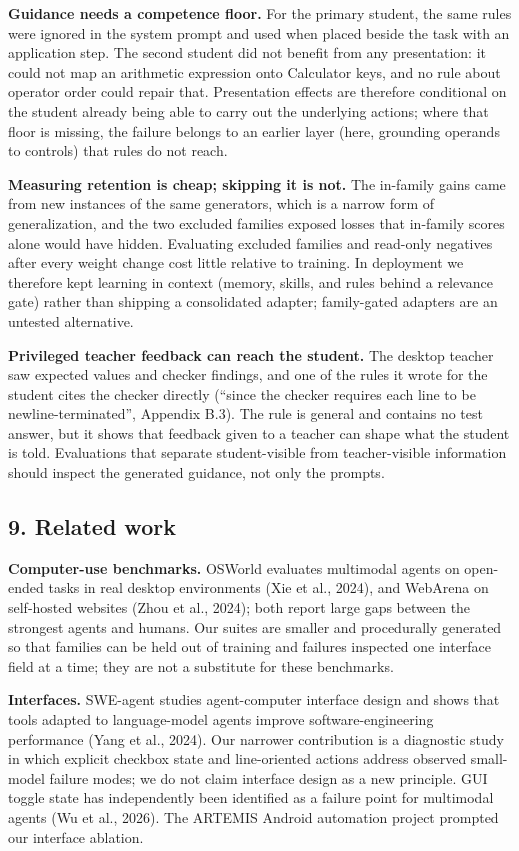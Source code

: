 \documentclass[
  10pt,
]{article}
\begin{document}
\textbf{Guidance needs a competence floor.} For the primary student, the
same rules were ignored in the system prompt and used when placed beside
the task with an application step. The second student did not benefit
from any presentation: it could not map an arithmetic expression onto
Calculator keys, and no rule about operator order could repair that.
Presentation effects are therefore conditional on the student already
being able to carry out the underlying actions; where that floor is
missing, the failure belongs to an earlier layer (here, grounding
operands to controls) that rules do not reach.

\textbf{Measuring retention is cheap; skipping it is not.} The in-family
gains came from new instances of the same generators, which is a narrow
form of generalization, and the two excluded families exposed losses
that in-family scores alone would have hidden. Evaluating excluded
families and read-only negatives after every weight change cost little
relative to training. In deployment we therefore kept learning in
context (memory, skills, and rules behind a relevance gate) rather than
shipping a consolidated adapter; family-gated adapters are an untested
alternative.

\textbf{Privileged teacher feedback can reach the student.} The desktop
teacher saw expected values and checker findings, and one of the rules
it wrote for the student cites the checker directly (``since the checker
requires each line to be newline-terminated'', Appendix B.3). The rule
is general and contains no test answer, but it shows that feedback given
to a teacher can shape what the student is told. Evaluations that
separate student-visible from teacher-visible information should inspect
the generated guidance, not only the prompts.

\subsection{9. Related work}\label{related-work}

\textbf{Computer-use benchmarks.} OSWorld evaluates multimodal agents on
open-ended tasks in real desktop environments (Xie et al., 2024), and
WebArena on self-hosted websites (Zhou et al., 2024); both report large
gaps between the strongest agents and humans. Our suites are smaller and
procedurally generated so that families can be held out of training and
failures inspected one interface field at a time; they are not a
substitute for these benchmarks.

\textbf{Interfaces.} SWE-agent studies agent-computer interface design
and shows that tools adapted to language-model agents improve
software-engineering performance (Yang et al., 2024). Our narrower
contribution is a diagnostic study in which explicit checkbox state and
line-oriented actions address observed small-model failure modes; we do
not claim interface design as a new principle. GUI toggle state has
independently been identified as a failure point for multimodal agents
(Wu et al., 2026). The ARTEMIS Android automation project prompted our
interface ablation.
\end{document}
